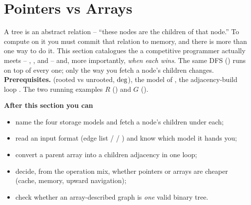 \section{Pointers vs Arrays}\label{sec:c04-reps}

\begin{topicintro}
A tree is an abstract relation -- ``these nodes are the children of that node.'' To
compute on it you must commit that relation to memory, and there is more than one way
to do it. This section catalogues the  a competitive programmer
actually meets -- , , 
and  -- and, more importantly, \emph{when each wins}. The
same DFS () runs on top of every one; only the way you fetch a node's
children changes.
\textbf{Prerequisites.}  (rooted vs unrooted, $\operatorname{deg}$), the
 model of , the adjacency-build loop .
The two running examples $R$ () and $G$ ().

\textbf{After this section you can}
\begin{itemize}[nosep]
  \item name the four storage models and fetch a node's children under each;      \hfill{}
  \item read an input format (edge list /  / ) and
        know which model it hands you;                                            \hfill{}
  \item convert a parent array into a children adjacency in one loop;             \hfill{}
  \item decide, from the operation mix, whether pointers or arrays are cheaper
        (cache, memory, upward navigation);                                       \hfill{}
  \item check whether an array-described graph is \emph{one} valid binary tree.    \hfill{}
\end{itemize}
\end{topicintro}

